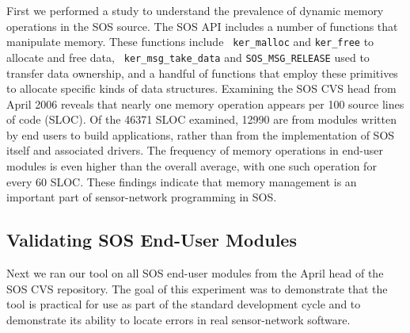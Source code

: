 First we performed a study to understand the prevalence of dynamic
memory operations in the SOS source.  The SOS API includes a number of
functions that manipulate memory.  These functions include {\tt
ker\_malloc} and {\tt ker\_free} to allocate and free data, {\tt
ker\_msg\_take\_data} and {\tt SOS\_MSG\_RELEASE} used to transfer
data ownership, and a handful of functions that employ these
primitives to allocate specific kinds of data structures.  Examining
the SOS CVS head from April 2006 reveals that nearly one memory
operation appears per 100 source lines of code (SLOC).  Of the 46371
SLOC examined, 12990 are from modules written by end users to build
applications, rather than from the implementation of SOS itself and
associated drivers.  The frequency of memory operations in end-user
modules is even higher than the overall average, with one such
operation for every 60 SLOC.  
These findings indicate that memory management is an important part of
sensor-network programming in SOS.


\subsection{Validating SOS End-User Modules}

Next we ran our tool on all SOS end-user modules from the April head
of the SOS CVS repository.  The goal of this experiment was to
demonstrate that the tool is practical for use as part of the standard
development cycle and to demonstrate its ability to locate errors in
real sensor-network software.

%

